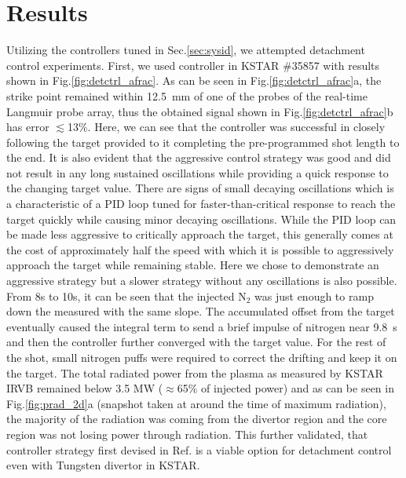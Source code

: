 \section{Results}
\label{sec:results}





Utilizing the controllers tuned in Sec.\ref{sec:sysid}, we attempted detachment control experiments.
First, we used \Afrac controller in KSTAR \#35857 with results shown in Fig.\ref{fig:detctrl_afrac}.
As can be seen in Fig.\ref{fig:detctrl_afrac}a, the strike point remained within 12.5~mm of one of the probes of the real-time Langmuir probe array, thus the obtained \Afrac signal shown in Fig.\ref{fig:detctrl_afrac}b has error $\lesssim$13\%.
Here, we can see that the controller was successful in closely following the target provided to it completing the pre-programmed shot length to the end.
It is also evident that the aggressive control strategy was good and did not result in any long sustained oscillations while providing a quick response to the changing target value.
There are signs of small decaying oscillations which is a characteristic of a PID loop tuned for faster-than-critical response to reach the target quickly while causing minor decaying oscillations.
While the PID loop can be made less aggressive to critically approach the target, this generally comes at the cost of approximately half the speed with which it is possible to aggressively approach the target while remaining stable.
Here we chose to demonstrate an aggressive strategy but a slower strategy without any oscillations is also possible.
From 8s to 10s, it can be seen that the injected N$_2$ was just enough to ramp down the measured \Afrac with the same slope.
The accumulated offset from the target eventually caused the integral term to send a brief impulse of nitrogen near 9.8~s and then the controller further converged with the target value.
For the rest of the shot, small nitrogen puffs were required to correct the drifting \Afrac and keep it on the target.
The total radiated power from the plasma as measured by KSTAR \ac{IRVB} remained below 3.5 MW ($\approx$65\% of injected power) and as can be seen in Fig.\ref{fig:prad_2d}a (snapshot taken at around the time of maximum radiation), the majority of the radiation was coming from the divertor region and the core region was not losing power through radiation.
This further validated, that \Afrac controller strategy first devised in Ref.\cite{Eldon_2022_PPCF} is a viable option for detachment control even with Tungsten divertor in KSTAR.

